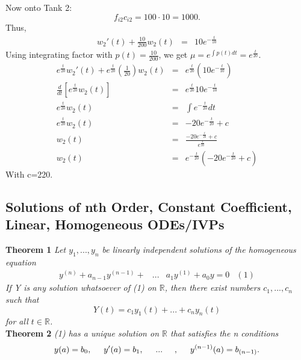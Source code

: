 \documentclass[10pt]{article}
\begin{document}
\begin{enumerate}
            Now onto Tank 2: $$f_{i2}c_{i2}=100\cdot10 = 1000.$$
            Thus,
            \begin{eqnarray*}
                w_2'(t)+\frac{10}{200}w_2(t)&=&10e^{-\frac{t}{10}}
            \end{eqnarray*}
            Using integrating factor with $p(t)=\frac{10}{200}$, we get $\mu=e^{\int p(t)dt}=e^{\frac{t}{20}}$.
            \begin{eqnarray*}
            e^{\frac{t}{20}}w_2'(t)+e^{\frac{t}{20}}(\frac{1}{20})w_2(t)&=&e^{\frac{t}{20}}(10e^{-\frac{t}{10}})\\
            \frac{d}{dt}[e^{\frac{t}{20}}w_2(t)]&=&e^{\frac{t}{20}}10e^{-\frac{t}{10}}\\
            e^{\frac{t}{20}}w_2(t)&=&\int{e^{-\frac{t}{20}}dt}\\
            e^{\frac{t}{20}}w_2(t)&=&-20e^{-\frac{t}{20}}+c\\
            w_2(t)&=&\frac{-20e^{-\frac{t}{20}}+c}{e^{\frac{t}{20}}}\\
            w_2(t)&=&e^{-\frac{t}{20}}(-20e^{-\frac{t}{20}}+c)
            \end{eqnarray*}
            With c=220. 
        \end{enumerate}
    
    \subsection{Solutions of nth Order, Constant Coefficient, Linear, Homogeneous ODEs/IVPs}
        {\bf Theorem 1} {\it Let $y_1,...,y_n$ be linearly independent solutions of the homogeneous equation} 
            \begin{eqnarray*}
            y^{(n)}+a_{n-1}y^{(n-1)}+&...&a_1y^{(1)}+a_0y=0 &(1)
            \end{eqnarray*}
            {\it If Y is any solution whatsoever of (1) on $\mathbb{R}$, then there exist numbers $c_1,...,c_n$ such that $$Y(t)=c_1y_1(t)+...+c_n y_n (t)$$ for all $t\in\mathbb{R}$.}\\
        {\bf Theorem 2} {\it (1) has a unique solution on $\mathbb{R}$ that satisfies the n conditions $$y(a)=b_0,\hspace{.5cm}y'(a)=b_1,\hspace{.5cm}...\hspace{.5cm},\hspace{.5cm} y^{(n-1)}(a)=b_{(n-1)}.$$}
\end{document}
